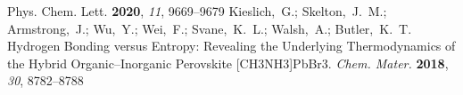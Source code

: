\documentclass[journal=jpccck,manuscript=article,layout=twocolumn]{achemso}
\begin{document}
\begin{mcitethebibliography}{62}
{  Phys. Chem. Lett.} \textbf{2020}, \emph{11}, 9669--9679\relax
\mciteBstWouldAddEndPuncttrue
\mciteSetBstMidEndSepPunct{\mcitedefaultmidpunct}
{\mcitedefaultendpunct}{\mcitedefaultseppunct}\relax
\EndOfBibitem
{}
Kieslich,~G.; Skelton,~J.~M.; Armstrong,~J.; Wu,~Y.; Wei,~F.; Svane,~K.~L.;
  Walsh,~A.; Butler,~K.~T. Hydrogen Bonding versus Entropy: Revealing the
  Underlying Thermodynamics of the Hybrid Organic–Inorganic Perovskite
  [CH3NH3]PbBr3. \emph{Chem. Mater.} \textbf{2018}, \emph{30}, 8782--8788\relax
\mciteBstWouldAddEndPuncttrue
\mciteSetBstMidEndSepPunct{\mcitedefaultmidpunct}
{\mcitedefaultendpunct}{\mcitedefaultseppunct}\relax
\EndOfBibitem
\end{mcitethebibliography}
\end{document}

